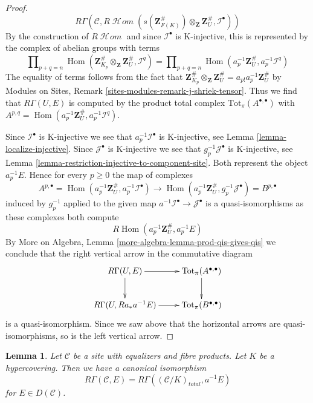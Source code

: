 \documentclass{stacks-project}
\theoremstyle{plain}
\newtheorem{lemma}[subsection]{Lemma}
\theoremstyle{definition}
\theoremstyle{remark}
\numberwithin{equation}{subsection}
\def\Hom{\mathop{\mathrm{Hom}}\nolimits}
\def\SheafHom{\mathop{\mathcal{H}\!\mathit{om}}\nolimits}
\begin{document}
\begin{proof}
$$
R\Gamma(\mathcal{C}, R\SheafHom(
s(\mathbf{Z}_{F(K)}^\#) \otimes_\mathbf{Z} \mathbf{Z}_U^\#,
\mathcal{I}^\bullet))
$$
By the construction of $R\SheafHom$ and since $\mathcal{I}^\bullet$
is K-injective, this is represented by the complex of abelian groups
with terms
$$
\prod\nolimits_{p + q = n}
\Hom(\mathbf{Z}^\#_{K_p} \otimes_\mathbf{Z} \mathbf{Z}_U^\#, \mathcal{I}^q)
=
\prod\nolimits_{p + q = n}
\Hom(a_p^{-1}\mathbf{Z}_U^\#, a_p^{-1}\mathcal{I}^q)
$$
The equality of terms follows from the fact that
$\mathbf{Z}^\#_{K_p} \otimes_\mathbf{Z} \mathbf{Z}_U^\# =
a_{p!}a_p^{-1}\mathbf{Z}_U^\#$ by Modules on Sites,
Remark \ref{sites-modules-remark-j-shriek-tensor}.
Thus we find that $R\Gamma(U, E)$ is computed by
the product total complex $\text{Tot}_\pi(A^{\bullet, \bullet})$
with $A^{p, q} = \Hom(a_p^{-1}\mathbf{Z}_U^\#, a_p^{-1}\mathcal{I}^q)$.

\medskip\noindent
Since $\mathcal{I}^\bullet$ is K-injective we see that
$a_p^{-1}\mathcal{I}^\bullet$ is K-injective, see
Lemma \ref{lemma-localize-injective}.
Since $\mathcal{J}^\bullet$ is K-injective we see that
$g_p^{-1}\mathcal{J}^\bullet$ is K-injective, see
Lemma \ref{lemma-restriction-injective-to-component-site}.
Both represent the object $a_p^{-1}E$.
Hence for every $p \geq 0$ the map of complexes
$$
A^{p, \bullet} = \Hom(a_p^{-1}\mathbf{Z}_U^\#, a_p^{-1}\mathcal{I}^\bullet)
\longrightarrow
\Hom(a_p^{-1}\mathbf{Z}_U^\#, g_p^{-1}\mathcal{J}^\bullet) = B^{p, \bullet}
$$
induced by $g_p^{-1}$ applied to the given map
$a^{-1}\mathcal{I}^\bullet \to \mathcal{J}^\bullet$
is a quasi-isomorphisms as these complexes both compute
$$
R\Hom(a_p^{-1}\mathbf{Z}_U^\#, a_p^{-1}E)
$$
By More on Algebra, Lemma \ref{more-algebra-lemma-prod-qis-gives-qis}
we conclude that the right vertical arrow in the commutative diagram
$$
\xymatrix{
R\Gamma(U, E) \ar[r] \ar[d] &
\text{Tot}_\pi(A^{\bullet, \bullet}) \ar[d] \\
R\Gamma(U, Ra_*a^{-1}E) \ar[r] &
\text{Tot}_\pi(B^{\bullet, \bullet})
}
$$
is a quasi-isomorphism. Since we saw above that the horizontal arrows
are quasi-isomorphisms, so is the left vertical arrow.
\end{proof}

\begin{lemma}
\label{lemma-compare-cohomology-hypercovering}
Let $\mathcal{C}$ be a site with equalizers and fibre products.
Let $K$ be a hypercovering.
Then we have a canonical isomorphism
$$
R\Gamma(\mathcal{C}, E) =
R\Gamma((\mathcal{C}/K)_{total}, a^{-1}E)
$$
for $E \in D(\mathcal{C})$.
\end{lemma}
\end{document}
